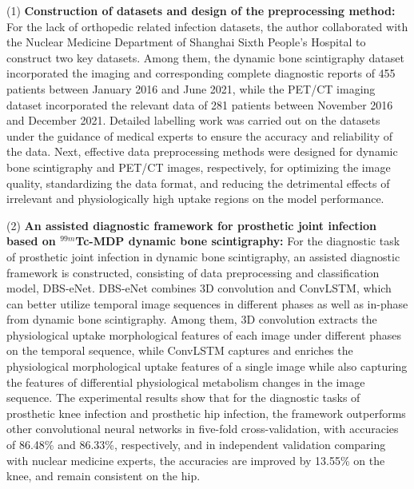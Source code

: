 \begin{eabstract}
    (1) \textbf{Construction of datasets and design of the preprocessing method: }For the lack of orthopedic related infection datasets, the author collaborated with the Nuclear Medicine Department of Shanghai Sixth People's Hospital to construct two key datasets. Among them, the dynamic bone scintigraphy dataset incorporated the imaging and corresponding complete diagnostic reports of 455 patients between January 2016 and June 2021, while the PET/CT imaging dataset incorporated the relevant data of 281 patients between November 2016 and December 2021. Detailed labelling work was carried out on the datasets under the guidance of medical experts to ensure the accuracy and reliability of the data. Next, effective data preprocessing methods were designed for dynamic bone scintigraphy and PET/CT images, respectively, for optimizing the image quality, standardizing the data format, and reducing the detrimental effects of irrelevant and physiologically high uptake regions on the model performance.

    (2) \textbf{An assisted diagnostic framework for prosthetic joint infection based on \(^{99m}\)Tc-MDP dynamic bone scintigraphy: }For the diagnostic task of prosthetic joint infection in dynamic bone scintigraphy, an assisted diagnostic framework is constructed, consisting of data preprocessing and classification model, DBS-eNet. DBS-eNet combines 3D convolution and ConvLSTM, which can better utilize temporal image sequences in different phases as well as in-phase from dynamic bone scintigraphy. Among them, 3D convolution extracts the physiological uptake morphological features of each image under different phases on the temporal sequence, while ConvLSTM captures and enriches the physiological morphological uptake features of a single image while also capturing the features of differential physiological metabolism changes in the image sequence. The experimental results show that for the diagnostic tasks of prosthetic knee infection and prosthetic hip infection, the framework outperforms other convolutional neural networks in five-fold cross-validation, with accuracies of 86.48\% and 86.33\%, respectively, and in independent validation comparing with nuclear medicine experts, the accuracies are improved by 13.55\% on the knee, and remain consistent on the hip.


\end{eabstract}
